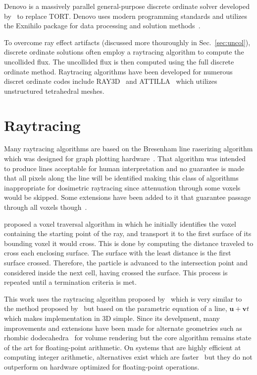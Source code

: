Denovo is a massively parallel general-purpose discrete ordinate solver developed by~\citet{ref:evanst} to replace TORT. Denovo uses modern programming standards and utilizes the Exnihilo package for data processing and solution methods~\citep{ref:evanst2}. 

To overcome ray effect artifacts (discussed more thouroughly in Sec.~\ref{sec:uncol}), discrete ordinate solutions often employ a raytracing algorithm to compute the uncollided flux. The uncollided flux is then computed using the full discrete ordinate method. Raytracing algorithms have been developed for numerous discret ordinate codes include RAY3D~\citep{ref:yingz} and ATTILLA~\citep{ref:wareingt} which utilizes unstructured tetrahedral meshes.

\section{Raytracing}

Many raytracing algorithms are based on the Bresenham line raserizing algorithm which was designed for graph plotting hardware~\citep{ref:bresenhamj}. That algorithm was intended to produce lines acceptable for human interpretation and no guarantee is made that all pixels along the line will be identified making this class of algorithms inappropriate for dosimetric raytracing since attenuation through some voxels would be skipped. Some extensions have been added to it that guarantee passage through all voxels though~\citep{ref:liuy}.

\citet{ref:clearyj} proposed a voxel traversal algorithm in which he initially identifies the voxel containing the starting point of the ray, and transport it to the first surface of its bounding voxel it would cross. This is done by computing the distance traveled to cross each enclosing surface. The surface with the least distance is the first surface crossed. Therefore, the particle is advanced to the intersection point and considered inside the next cell, having crossed the surface. This process is repeated until a termination criteria is met.

This work uses the raytracing algorithm proposed by~\citet{ref:wooa} which is very similar to the method proposed by~\citet{ref:clearyj} but based on the parametric equation of a line, $\boldsymbol{u} + \boldsymbol{v}t$ which makes implementation in 3D simple. Since its develpment, many improvements and extensions have been made for alternate geometries such as rhombic dodecahedra~\citep{ref:hel} for volume rendering but the core algorithm remains state of the art for floating-point arithmetic. On systems that are highly efficient at computing integer arithmetic, alternatives exist which are faster~\citep{ref:liuy} but they do not outperform on hardware optimized for floating-point operations.


